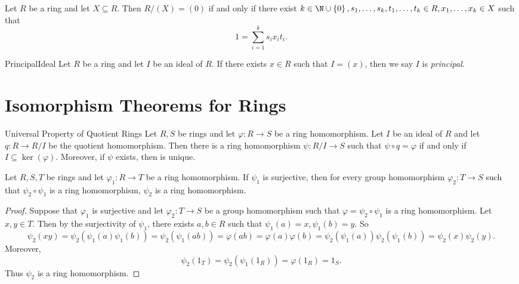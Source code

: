 \documentclass[pmath347]{subfiles}
\begin{document}
    \begin{cor}{}
        Let $R$ be a ring and let $X\subseteq R$. Then $R /\left( X \right)=\left( 0 \right)$ if and only if there exist $k\in\N\cup\left\lbrace 0 \right\rbrace , s_1,\ldots,s_k,t_1,\ldots,t_k\in R, x_1,\ldots,x_k\in X$ such that
        \begin{equation*}
            1 = \sum^{k}_{i=1} s_ix_it_i.
        \end{equation*}
    \end{cor}	

    \begin{definition}{Principal}{Ideal}
        Let $R$ be a ring and let $I$ be an ideal of $R$. If there exists $x\in R$ such that $I=\left( x \right)$, then we say $I$ is \emph{principal}.
    \end{definition}

    \section{Isomorphism Theorems for Rings}

    \begin{theorem}{Universal Property of Quotient Rings}
        Let $R,S$ be rings and let $\varphi:R\to S$ be a ring homomorphism. Let $I$ be an ideal of $R$ and let $q:R\to R /I$ be the quotient homomorphism. Then there is a ring homomorphism $\psi: R /I \to S$ such that $\psi\circ q=\varphi$ if and only if $I\subseteq\ker\left( \varphi \right)$. Moreover, if $\psi$ exists, then is unique.
    \end{theorem}

    \begin{lemma_inside}{}
        Let $R,S,T$ be rings and let $\varphi_1:R\to T$ be a ring homomorphism. If $\psi_1$ is surjective, then for every group homomorphism $\varphi_2:T\to S$ such that $\psi_2\circ\psi_1$ is a ring homomorphism, $\psi_2$ is a ring homomorphism.
    \end{lemma_inside}
    
    \begin{proof}
        Suppose that $\varphi_1$ is surjective and let $\varphi_2:T\to S$ be a group homomorphism such that $\varphi=\psi_2\circ\psi_1$ is a ring homomorphism. Let $x,y\in T$. Then by the surjectivity of $\psi_1$, there exists $a,b\in R$ such that $\psi_1\left( a \right) = x, \psi_1\left( b \right) = y$. So
        \begin{equation*}
            \psi_2\left( xy \right) = \psi_2\left( \psi_1\left( a \right) \psi_1\left( b \right)  \right) = \psi_2\left( \psi_1\left( ab \right)  \right) = \varphi\left( ab \right) = \varphi\left( a \right) \varphi\left( b \right) = \psi_2\left( \psi_1\left( a \right)  \right) \psi_2\left( \psi_1\left( b \right)  \right) = \psi_2\left( x \right) \psi_2\left( y \right) .
        \end{equation*}
        Moreover,
        \begin{equation*}
            \psi_2\left( 1_T \right) = \psi_2\left( \psi_1\left( 1_R \right)  \right) = \varphi\left( 1_R \right) = 1_S.
        \end{equation*}
        Thus $\psi_2$ is a ring homomorphism.
    \end{proof}
    
\end{document}

